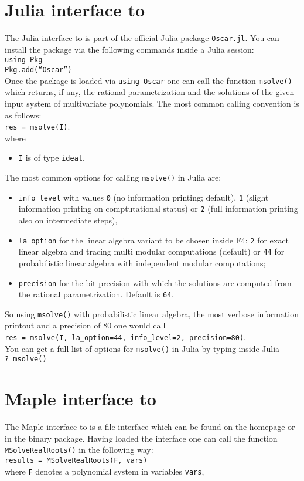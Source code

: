 \documentclass[a4paper,english,11pt]{scrartcl}
\theoremstyle{definition}
\theoremstyle{remark}
\begin{document}
\section{Julia interface to \msolve}
The Julia interface to \msolve is part of the official Julia package
\texttt{Oscar.jl}. You can install the package via the following
commands inside a Julia session:\\[1em]
\texttt{using Pkg\\
Pkg.add(“Oscar”)}\\[1em]
Once the package is loaded via \texttt{using Oscar} one can call the function
\texttt{msolve()} which returns, if any, the rational parametrization and the solutions of the given input
system of multivariate polynomials. The most common calling convention is as follows:\\[1em]
\texttt{res = msolve(I)}.\\[1em]
where
\begin{itemize}
    \item \texttt{I} is of type \texttt{ideal}.
\end{itemize}
The most common options for calling \texttt{msolve()} in Julia are:
\begin{itemize}
    \item \texttt{info\_level} with values \texttt{0} (no information printing;
        default), \texttt{1} (slight information printing on comptutational
        status) or \texttt{2} (full information printing also on intermediate
        steps),
    \item \texttt{la\_option} for the linear algebra variant to be chosen inside
        F4: \texttt{2} for exact linear algebra and tracing multi modular
        computations (default) or \texttt{44} for probabilistic linear algebra
        with independent modular computations;
    \item \texttt{precision} for the bit precision with which the solutions are
        computed from the rational parametrization. Default is \texttt{64}.
\end{itemize}
So using \texttt{msolve()} with probabilistic linear algebra, the most verbose
information printout and a precision of $80$ one would call\\[1em]
\texttt{res = msolve(I, la\_option=44, info\_level=2,
precision=80)}.\\[1em]
You can get a full list of options for \texttt{msolve()} in Julia by typing
inside Julia\\[1em]
\texttt{? msolve()}
\section{Maple interface to \msolve}
The Maple interface to \msolve is a file interface which can be found on the
\msolve homepage or in the \msolve binary package. Having loaded the interface
one can call the function
\texttt{MSolveRealRoots()} in the following way:\\[1em]
\texttt{results = MSolveRealRoots(F, vars)}\\[1em]
where \texttt{F} denotes a polynomial system in variables \texttt{vars},
\end{document}
